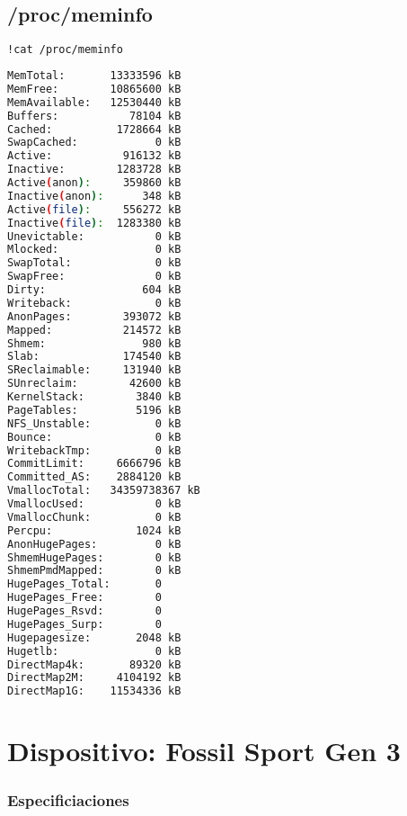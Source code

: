 \subsection{/proc/meminfo}
\begin{lstlisting}[language=bash,tabsize=2,name=cpuinfo,frame=single]
!cat /proc/meminfo
\end{lstlisting}
\begin{lstlisting}[language=bash,name=cpuinfo,backgroundcolor=\color{Gray!20},lineskip=-1pt,basicstyle=\footnotesize]
MemTotal:       13333596 kB
MemFree:        10865600 kB
MemAvailable:   12530440 kB
Buffers:           78104 kB
Cached:          1728664 kB
SwapCached:            0 kB
Active:           916132 kB
Inactive:        1283728 kB
Active(anon):     359860 kB
Inactive(anon):      348 kB
Active(file):     556272 kB
Inactive(file):  1283380 kB
Unevictable:           0 kB
Mlocked:               0 kB
SwapTotal:             0 kB
SwapFree:              0 kB
Dirty:               604 kB
Writeback:             0 kB
AnonPages:        393072 kB
Mapped:           214572 kB
Shmem:               980 kB
Slab:             174540 kB
SReclaimable:     131940 kB
SUnreclaim:        42600 kB
KernelStack:        3840 kB
PageTables:         5196 kB
NFS_Unstable:          0 kB
Bounce:                0 kB
WritebackTmp:          0 kB
CommitLimit:     6666796 kB
Committed_AS:    2884120 kB
VmallocTotal:   34359738367 kB
VmallocUsed:           0 kB
VmallocChunk:          0 kB
Percpu:             1024 kB
AnonHugePages:         0 kB
ShmemHugePages:        0 kB
ShmemPmdMapped:        0 kB
HugePages_Total:       0
HugePages_Free:        0
HugePages_Rsvd:        0
HugePages_Surp:        0
Hugepagesize:       2048 kB
Hugetlb:               0 kB
DirectMap4k:       89320 kB
DirectMap2M:     4104192 kB
DirectMap1G:    11534336 kB
\end{lstlisting}

\section{Dispositivo: Fossil Sport Gen 3} \label{app:sec:fossil}

\subsubsection{Especificiaciones}


